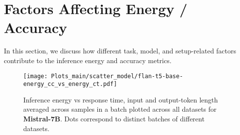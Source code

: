 

\section{Factors Affecting Energy / Accuracy}
In this section, we discuss how different task, model, and setup-related factors contribute to the inference energy and accuracy metrics.



\begin{figure*}[!t]
\centering

\texttt{[image: Plots\_main/scatter\_model/flan-t5-base-energy\_cc\_vs\_energy\_ct.pdf]}
\vspace*{-6mm}

\hfill
{}
\hfill
{}

\caption{Inference energy vs response time, input and output-token length averaged across samples in a batch plotted across all datasets for  \textbf{Mistral-7B}. Dots correspond to distinct batches of different datasets.}%
\label{fig:energy-scatter}
\end{figure*}





